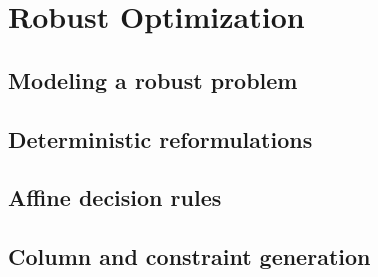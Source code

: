 \part{Robust Optimization}
\chapter{Modeling a robust problem}
\chapter{Deterministic reformulations}
\chapter{Affine decision rules}
\chapter{Column and constraint generation}
